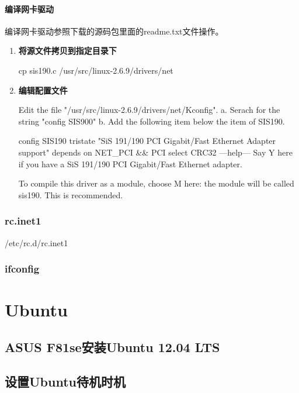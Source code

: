 \documentclass{book}
\begin{document}
\paragraph{编译网卡驱动}
编译网卡驱动参照下载的源码包里面的readme.txt文件操作。
\begin{enumerate}
	\setcounter{enumi}{0}
	\item{\textbf{将源文件拷贝到指定目录下~~}}
	
	cp sis190.c /usr/src/linux-2.6.9/drivers/net
	
	\item{\textbf{编辑配置文件~~}}
	
	Edit the file "/usr/src/linux-2.6.9/drivers/net/Kconfig".
	a. Serach for the string "config SIS900"
	b. Add the following item below the item of SIS190.
	
	config SIS190\newline
	tristate "SiS 191/190 PCI Gigabit/Fast Ethernet Adapter support"\newline
	depends on NET\_PCI \&\& PCI\newline
	select CRC32\newline
	---help---\newline
	Say Y here if you have a SiS 191/190 PCI Gigabit/Fast Ethernet adapter.
	
	To compile this driver as a module, choose M here: the module
	will be called sis190.  This is recommended.
	
\end{enumerate}

\subsubsection{rc.inet1}
/etc/rc.d/rc.inet1
\subsubsection{ifconfig}

\section{Ubuntu}

\subsection{ASUS F81se安装Ubuntu 12.04 LTS}

\subsection{设置Ubuntu待机时机}
\end{document}

